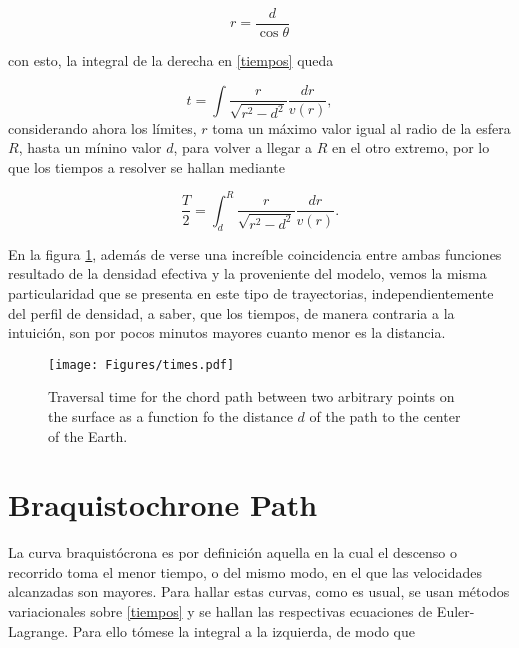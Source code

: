 \documentclass[aps,twocolumn,showpacs,preprintnumbers]{revtex4}
\begin{document}
        \begin{equation}
            r = \frac{d}{\cos{\theta}}
        \end{equation}
            
        con esto, la integral de la derecha en \eqref{tiempos} queda 
            
            \begin{equation*}
                t = \int \frac{r}{\sqrt{r^2 -d^2}} \frac{dr}{v(r)},
            \end{equation*}
            considerando ahora los límites, $r$ toma un máximo valor igual al radio de la esfera $R$, hasta un mínino valor $d$, para volver a llegar a $R$ en el otro extremo, por lo que los tiempos a resolver se hallan mediante
            
            \begin{equation}
                \frac{T}{2} =  \int_{d}^{R} \frac{r}{\sqrt{r^2 -d^2}} \frac{dr}{v(r)}.
                \label{tiempos camino recto}
            \end{equation}
            
            En la figura \ref{fig:times}, además de verse una increíble coincidencia entre ambas funciones resultado de la densidad efectiva y la proveniente del modelo, vemos la misma particularidad que se presenta en este tipo de trayectorias, independientemente del perfil de densidad, a saber, que los tiempos, de manera contraria a la intuición, son por pocos minutos mayores cuanto menor es la distancia.
            
            
            \begin{figure}
                \centering
                 \texttt{[image: Figures/times.pdf]}
                \caption{Traversal time for the chord path between two arbitrary points on the surface as a function fo the distance $d$ of the path to the center of the Earth.}
                \label{fig:times}
            \end{figure}
            
            
\section{Braquistochrone Path}\label{braquistochrone section}
        
            La curva braquistócrona es por definición aquella en la cual el descenso o recorrido toma el menor tiempo, o del mismo modo, en el que las velocidades alcanzadas son mayores. Para hallar estas curvas,  como es usual, se usan métodos variacionales sobre  \eqref{tiempos} y se hallan las respectivas ecuaciones de Euler-Lagrange. Para ello tómese la integral a la izquierda, de modo que
            
\end{document}
